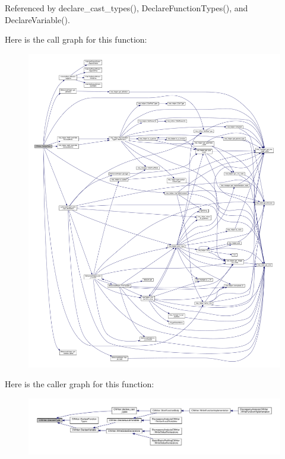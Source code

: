 Referenced by declare\+\_\+cast\+\_\+types(), Declare\+Function\+Types(), and Declare\+Variable().

Here is the call graph for this function\+:
\nopagebreak
\begin{figure}[H]
\begin{center}
\leavevmode
\includegraphics[width=350pt]{d3/d59/classCWriter_a34b098dce3408ece8f310af807c52368_cgraph}
\end{center}
\end{figure}
Here is the caller graph for this function\+:
\nopagebreak
\begin{figure}[H]
\begin{center}
\leavevmode
\includegraphics[width=350pt]{d3/d59/classCWriter_a34b098dce3408ece8f310af807c52368_icgraph}
\end{center}
\end{figure}
\mbox{\label{classCWriter_a93167492cece9b71202aa311930b355d}} 
